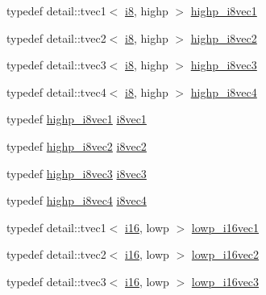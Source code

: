 \begin{CompactItemize}
\item 
typedef detail::tvec1$<$ \hyperlink{group__gtc__type__precision_gae064be68b7d36cd7910c16e8ad18bba}{i8}, highp $>$ \hyperlink{group__gtc__type__precision_g0334353753f93388bcc89f91c9aff476}{highp\_\-i8vec1}
\item 
typedef detail::tvec2$<$ \hyperlink{group__gtc__type__precision_gae064be68b7d36cd7910c16e8ad18bba}{i8}, highp $>$ \hyperlink{group__gtc__type__precision_g2224945795a870e41d951f0847d54f02}{highp\_\-i8vec2}
\item 
typedef detail::tvec3$<$ \hyperlink{group__gtc__type__precision_gae064be68b7d36cd7910c16e8ad18bba}{i8}, highp $>$ \hyperlink{group__gtc__type__precision_gd716792169ce7de963df25b865714438}{highp\_\-i8vec3}
\item 
typedef detail::tvec4$<$ \hyperlink{group__gtc__type__precision_gae064be68b7d36cd7910c16e8ad18bba}{i8}, highp $>$ \hyperlink{group__gtc__type__precision_g283b2f580a4bd7207d27418ef4a1068b}{highp\_\-i8vec4}
\item 
typedef \hyperlink{group__gtc__type__precision_g0334353753f93388bcc89f91c9aff476}{highp\_\-i8vec1} \hyperlink{group__gtc__type__precision_ge67d2e1e7ebd1a79176cac554395b881}{i8vec1}
\item 
typedef \hyperlink{group__gtc__type__precision_g2224945795a870e41d951f0847d54f02}{highp\_\-i8vec2} \hyperlink{group__gtc__type__precision_gfd7bbd3878c298014276975f999a8677}{i8vec2}
\item 
typedef \hyperlink{group__gtc__type__precision_gd716792169ce7de963df25b865714438}{highp\_\-i8vec3} \hyperlink{group__gtc__type__precision_ge1e3127c58fbf1b6fbf28885cfd3dfad}{i8vec3}
\item 
typedef \hyperlink{group__gtc__type__precision_g283b2f580a4bd7207d27418ef4a1068b}{highp\_\-i8vec4} \hyperlink{group__gtc__type__precision_g89bb5e6481ae11fb2599b71e36a390bb}{i8vec4}
\item 
typedef detail::tvec1$<$ \hyperlink{group__gtc__type__precision_g35e5542ca05b29cc256fdafb8503d1fd}{i16}, lowp $>$ \hyperlink{group__gtc__type__precision_g6f1e42c07424a2f14faf731c74ba2153}{lowp\_\-i16vec1}
\item 
typedef detail::tvec2$<$ \hyperlink{group__gtc__type__precision_g35e5542ca05b29cc256fdafb8503d1fd}{i16}, lowp $>$ \hyperlink{group__gtc__type__precision_g47c5d4c919266799ecc76d832356feff}{lowp\_\-i16vec2}
\item 
typedef detail::tvec3$<$ \hyperlink{group__gtc__type__precision_g35e5542ca05b29cc256fdafb8503d1fd}{i16}, lowp $>$ \hyperlink{group__gtc__type__precision_g5b71f24a26316aa21f3c58d25c8db9a8}{lowp\_\-i16vec3}

\end{CompactItemize}
